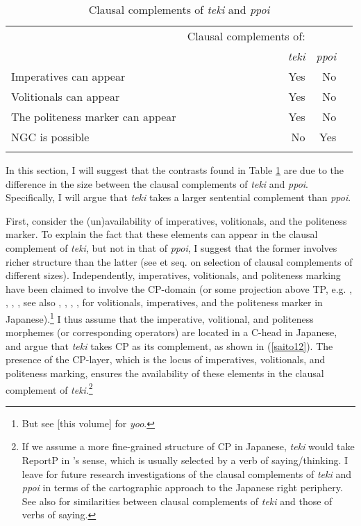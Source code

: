 \documentclass[output=paper]{langscibook}
\begin{document}
\begin{table}
\caption{Clausal complements of \emph{teki} and \emph{ppoi}}
\label{saitotab1}
 \begin{tabular}{l rrr}
  \lsptoprule
            &  Clausal complements of:\\ &
            \emph{teki} & \emph{ppoi}\\
  \midrule
  Imperatives can appear  &   Yes  &    No     \\
  Volitionals can appear &   Yes &   No      \\
  The politeness marker can appear & Yes & No \\
  NGC is possible & No & Yes\\
  \lspbottomrule
 \end{tabular}
\end{table}

In this section, I will suggest that the contrasts found in Table \ref{saitotab1} are due to the difference in the size between the clausal complements of \emph{teki} and \emph{ppoi}. Specifically, I will argue that \emph{teki} takes a larger sentential complement than \emph{ppoi}. 

First, consider the (un)availability of imperatives, volitionals, and the politeness marker. To explain the fact that these elements can appear in the clausal complement of \emph{teki}, but not in that of \emph{ppoi}, I suggest that the former involves richer structure than the latter (see \citealt{wurmbrand2001} et seq. on selection of clausal complements of different sizes). Independently, imperatives, volitionals, and politeness marking have been claimed to involve the CP-domain (or some projection above TP, e.g. \citealt{rizzi1997}, \citealt{Han1998}, \citealt{cinque1999}, \citealt{Haegeman2006}, see also \citealt{Ueda2007,Ueda2007}, \citealt{Endo2009}, \citealt{Hasegawa2010}, \citealt{miyagawa2012a}, \citealt{Yoshimoto2017} for volitionals, imperatives, and the politeness marker in Japanese).\footnote{But see \citealt{shimamura2021} [this volume] for \emph{yoo}.} I thus assume that the imperative, volitional, and politeness morphemes (or corresponding operators) are located in a C-head in Japanese, and argue that \emph{teki} takes CP as its complement, as shown in (\ref{saito12}). The presence of the CP-layer, which is the locus of imperatives, volitionals, and politeness marking, ensures the availability of these elements in the clausal complement of \emph{teki}.\footnote{If we assume a more fine-grained structure of CP in Japanese, \emph{teki} would take ReportP in \citeauthor{Saito2012}'s \citeyear{Saito2012} sense, which is usually selected by a verb of saying/thinking. I leave for future research investigations of the clausal complements of \emph{teki} and \emph{ppoi} in terms of the cartographic approach to the Japanese right periphery. See also \citet{Saito2017} for similarities between clausal complements of \emph{teki} and those of verbs of saying.}
\end{document}
